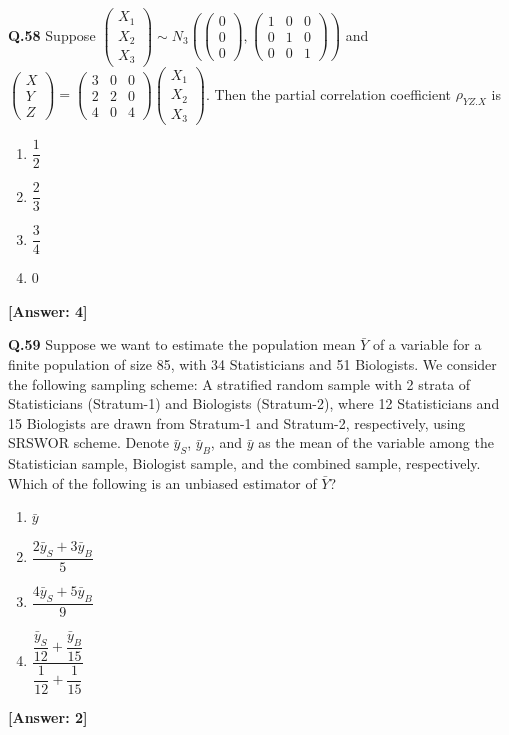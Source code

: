 \documentclass[12pt,a4paper]{article}
\newcommand{\ans}[1]{\quad\textcolor{anscolor}{\textbf{[Answer: #1]}}}
\begin{document}
\textbf{Q.58} Suppose $\begin{pmatrix}X_1\\X_2\\X_3\end{pmatrix}\sim N_3\!\!\left(\begin{pmatrix}0\\0\\0\end{pmatrix},\begin{pmatrix}1&0&0\\0&1&0\\0&0&1\end{pmatrix}\right)$ and $\begin{pmatrix}X\\Y\\Z\end{pmatrix}=\begin{pmatrix}3&0&0\\2&2&0\\4&0&4\end{pmatrix}\begin{pmatrix}X_1\\X_2\\X_3\end{pmatrix}$. Then the partial correlation coefficient $\rho_{YZ.X}$ is
\begin{enumerate}[label=\arabic*.]
\item $\dfrac{1}{2}$ \item $\dfrac{2}{3}$ \item $\dfrac{3}{4}$ \item $0$
\end{enumerate}\ans{4}

\textbf{Q.59} Suppose we want to estimate the population mean $\bar{Y}$ of a variable for a finite population of size 85, with 34 Statisticians and 51 Biologists. We consider the following sampling scheme: A stratified random sample with 2 strata of Statisticians (Stratum-1) and Biologists (Stratum-2), where 12 Statisticians and 15 Biologists are drawn from Stratum-1 and Stratum-2, respectively, using SRSWOR scheme. Denote $\bar{y}_S$, $\bar{y}_B$, and $\bar{y}$ as the mean of the variable among the Statistician sample, Biologist sample, and the combined sample, respectively. Which of the following is an unbiased estimator of $\bar{Y}$?
\begin{enumerate}[label=\arabic*.]
\item $\bar{y}$
\item $\dfrac{2\bar{y}_S+3\bar{y}_B}{5}$
\item $\dfrac{4\bar{y}_S+5\bar{y}_B}{9}$
\item $\dfrac{\dfrac{\bar{y}_S}{12}+\dfrac{\bar{y}_B}{15}}{\dfrac{1}{12}+\dfrac{1}{15}}$
\end{enumerate}\ans{2}
\end{document}
